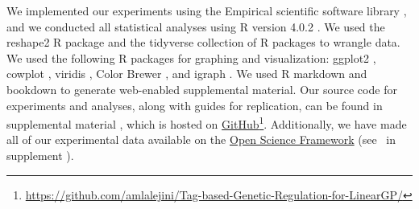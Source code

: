 We implemented our experiments using the Empirical scientific software library \citep{charles_ofria_2020_empirical}, and we conducted all statistical analyses using R version 4.0.2 \citep{r_language_2020}.
We used the reshape2 \cite{R-reshape2} R package and the tidyverse \citep{r_tidyverse_2019} collection of R packages to wrangle data. 
We used the following R packages for graphing and visualization: ggplot2 \citep{R-ggplot2}, cowplot \citep{R-cowplot}, viridis \citep{R-viridis}, Color Brewer \citep{harrower_colorbrewerorg_2003,R-Brewer_2014}, and igraph \citep{igraph2006}.
We used R markdown \citep{rmarkdown} and bookdown \citep{R-bookdown} to generate web-enabled supplemental material.
Our source code for experiments and analyses, along with guides for replication, can be found in supplemental material \citep{tag_regulation_supplement_2021}, which is hosted on \href{https://github.com/amlalejini/Tag-based-Genetic-Regulation-for-LinearGP/}{GitHub}\footnote{\url{https://github.com/amlalejini/Tag-based-Genetic-Regulation-for-LinearGP/}}.
Additionally, we have made all of our experimental data available on the \href{https://osf.io/928fx/}{Open Science Framework} (see \supSecDataAvailability\ in supplement \citep{tag_regulation_supplement_2021}).